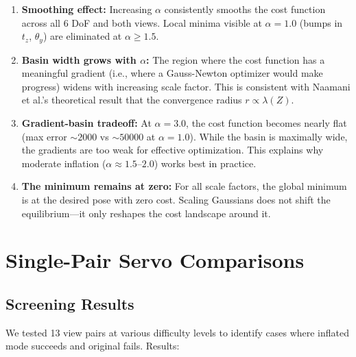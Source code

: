 \documentclass[11pt]{article}
\begin{document}
\begin{enumerate}
    \item \textbf{Smoothing effect:} Increasing $\alpha$ consistently smooths the cost function across all 6 DoF and both views. Local minima visible at $\alpha=1.0$ (bumps in $t_z$, $\theta_y$) are eliminated at $\alpha \geq 1.5$.

    \item \textbf{Basin width grows with $\alpha$:} The region where the cost function has a meaningful gradient (i.e., where a Gauss-Newton optimizer would make progress) widens with increasing scale factor. This is consistent with Naamani et al.'s theoretical result that the convergence radius $r \propto \lambda(Z)$.

    \item \textbf{Gradient-basin tradeoff:} At $\alpha=3.0$, the cost function becomes nearly flat (max error $\sim 2000$ vs $\sim 50000$ at $\alpha=1.0$). While the basin is maximally wide, the gradients are too weak for effective optimization. This explains why moderate inflation ($\alpha \approx 1.5$--$2.0$) works best in practice.

    \item \textbf{The minimum remains at zero:} For all scale factors, the global minimum is at the desired pose with zero cost. Scaling Gaussians does not shift the equilibrium---it only reshapes the cost landscape around it.
\end{enumerate}


\section{Single-Pair Servo Comparisons}
\label{sec:single_pair}

\subsection{Screening Results}

We tested 13 view pairs at various difficulty levels to identify cases where inflated mode succeeds and original fails. Results:
\end{document}
